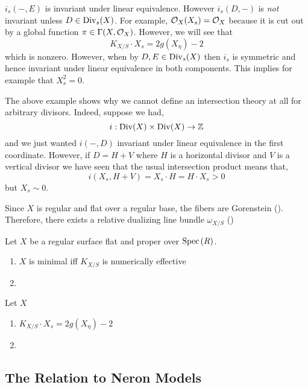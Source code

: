 \documentclass[12pt]{article}
\begin{document}
\begin{rmk}
$i_s(-, E)$ is invariant under linear equivalence. However $i_s(D, -)$ is  \textit{not} invariant unless $D \in \mathrm{Div}_s(X)$. For example, $\mathcal{O}_{X}(X_s) = \mathcal{O}_{X}$ because it is cut out by a global function $\pi \in \Gamma(X, \mathcal{O}_{X})$. However, we will see that
\[ K_{X/S} \cdot X_s = 2 g(X_\eta) - 2 \]
which is nonzero. However, when by $D, E \in \mathrm{Div}_s(X)$ then $i_s$ is symmetric and hence invariant under linear equivalence in both components. This implies for example that $X_s^2 = 0$.
\end{rmk}

\begin{rmk}
The above example shows why we cannot define an intersection theory at all for arbitrary divisors. Indeed, suppose we had,
\[ i : \mathrm{Div}(X) \times \mathrm{Div}(X) \to \mathbb{Z} \]
and we just wanted $i(-,D)$ invariant under linear equivalence in the first coordinate. However, if $D = H + V$ where $H$ is a horizontal divisor and $V$ is a vertical divisor we have seen that the usual intersection product means that,
\[ i(X_s, H + V) = X_s \cdot H = H \cdot X_s > 0 \]
but $X_s \sim 0$.  
\end{rmk}

Since $X$ is regular and flat over a regular base, the fibers are Gorenstein (). Therefore, there exists a relative dualizing line bundle $\omega_{X/S}$ () 

\begin{lemma}
Let $X$ be a regular surface flat and proper over $\mathrm{Spec}\left( R \right)$.
\begin{enumerate}
\item $X$ is minimal iff $K_{X/S}$ is numerically effective
\item 
\end{enumerate}
\end{lemma}

\begin{lemma}
Let $X$
\begin{enumerate}
\item $K_{X/S} \cdot X_s = 2 g(X_\eta) - 2$
\item 
\end{enumerate}
\end{lemma}

\subsection{The Relation to Neron Models}
\end{document}
